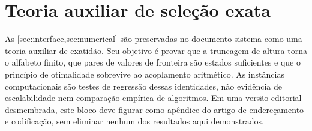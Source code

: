 \part*{Teoria auxiliar de seleção exata}

As \cref{sec:interface,sec:numerical} são preservadas no
documento-sistema como uma teoria auxiliar de exatidão. Seu objetivo é provar
que a truncagem de altura torna o alfabeto finito, que pares de valores de
fronteira são estados suficientes e que o princípio de otimalidade sobrevive
ao acoplamento aritmético. As instâncias computacionais são testes de regressão
dessas identidades, não evidência de escalabilidade nem comparação empírica de
algoritmos. Em uma versão editorial desmembrada, este bloco deve figurar como
apêndice do artigo de endereçamento e codificação, sem eliminar nenhum dos
resultados aqui demonstrados.
